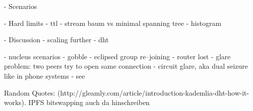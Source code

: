 
- Scenarios


- Hard limits
    - ttl
    - stream baum vs minimal spanning tree
        - histogram

- Discussion
- scaling further
    - dht

- nucleus scenarios
    - gobble
    - eclipsed group re–joining
    - router lost
    - glare problem: two peers try to open same connection
        - circuit glare, aka dual seizure like in phone systems
        - see \cite[pp. 194-194]{signaling-systems-book}


Random Quotes:
(http://gleamly.com/article/introduction-kademlia-dht-how-it-works). IPFS bitswapping auch da hinschreiben